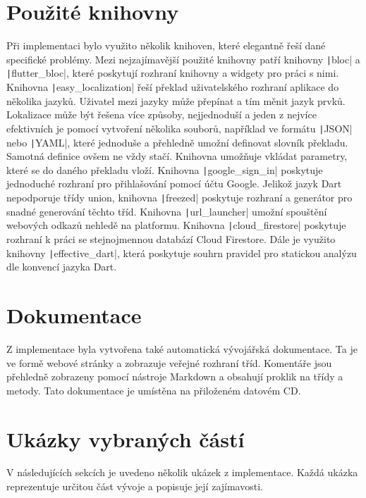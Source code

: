 \section{Použité knihovny}

Při implementaci bylo využito několik knihoven,
které elegantně řeší dané specifické problémy.
Mezi nejzajímavější použité knihovny patří knihovny
\texttt|bloc| a \texttt|flutter_bloc|,
které poskytují rozhraní knihovny a widgety pro práci s nimi.
Knihovna \texttt|easy_localization| řeší překlad uživatelského
rozhraní aplikace do několika jazyků.
Uživatel mezi jazyky může přepínat a tím měnit jazyk prvků.
Lokalizace může být řešena více způsoby,
nejjednoduší a jeden z nejvíce efektivních je pomocí vytvoření několika souborů,
například ve formátu \texttt|JSON| nebo \texttt|YAML|,
které jednoduše a přehledně umožní definovat slovník překladu.
Samotná definice ovšem ne vždy stačí.
Knihovna umožňuje vkládat parametry, které se do daného překladu vloží.
Knihovna \texttt|google_sign_in| poskytuje jednoduché rozhraní pro
přihlašování pomocí účtu Google.
Jelikož jazyk Dart nepodporuje třídy union,
knihovna \texttt|freezed| poskytuje rozhraní a generátor pro
snadné generování těchto tříd.
Knihovna \texttt|url_launcher| umožní spouštění webových odkazů
nehledě na platformu.
Knihovna \texttt|cloud_firestore| poskytuje rozhraní k práci se
stejnojmennou databází Cloud Firestore.
Dále je využito knihovny \texttt|effective_dart|,
která poskytuje souhrn pravidel pro statickou analýzu dle konvencí jazyka Dart.

\section{Dokumentace}

Z implementace byla vytvořena také automatická vývojářská dokumentace.
Ta je ve formě webové stránky a zobrazuje veřejné rozhraní tříd.
Komentáře jsou přehledně zobrazeny pomocí nástroje Markdown a obsahují proklik
na třídy a metody.
Tato dokumentace je umístěna na přiloženém datovém CD.

\section{Ukázky vybraných částí}

V následujících sekcích je uvedeno několik ukázek z implementace.
Každá ukázka reprezentuje určitou část vývoje a popisuje její zajímavosti.

